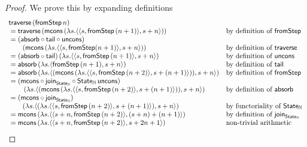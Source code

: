 \documentclass{article}
\begin{document}
\begin{proof}
We prove this by expanding definitions
$$
\begin{array}{ll}
\mathsf{traverse}\, (\mathsf{fromStep}\, n) \\
{}= \mathsf{traverse}\, (\mathsf{mcons}\, (\lambda s. \langle \langle s, \mathsf{fromStep}\, (n + 1) \rangle, s + n \rangle))
	& \mbox{by definition of }\mathsf{fromStep} \\
{}= (\mathsf{absorb} \circ \mathsf{tail} \circ \mathsf{uncons})\, \\\qquad (\mathsf{mcons}\, (\lambda s. \langle \langle s, \mathsf{fromStep} (n + 1) \rangle, s + n \rangle))
	& \mbox{by definition of }\mathsf{traverse} \\
{}= (\mathsf{absorb} \circ \mathsf{tail})\, (\lambda s. \langle \langle s, \mathsf{fromStep}\, (n + 1) \rangle, s + n \rangle)
	& \mbox{by definition of }\mathsf{uncons} \\
{}= \mathsf{absorb}\, (\lambda s. \langle \mathsf{fromStep}\, (n + 1), s + n \rangle)
	& \mbox{by definition of }\mathsf{tail} \\
{}= \mathsf{absorb}\, (\lambda s. \langle (\mathsf{mcons}\, (\lambda s. \langle \langle s, \mathsf{fromStep}\, (n + 2) \rangle, s + (n + 1) \rangle)), s + n \rangle)
	& \mbox{by definition of }\mathsf{fromStep} \\
{}= (\mathsf{mcons} \circ \mathsf{join}_{\mathsf{State}_{\mathbb{N}}} \circ \mathsf{State}_{\mathbb{N}}\,\mathsf{uncons}) \\\qquad \, (\lambda s. \langle (\mathsf{mcons}\, (\lambda s. \langle \langle s, \mathsf{fromStep}\, (n + 2) \rangle, s + (n + 1) \rangle)), s + n \rangle)
	& \mbox{by definition of }\mathsf{absorb} \\
{}= (\mathsf{mcons} \circ \mathsf{join}_{\mathsf{State}_{\mathbb{N}}})\, \\\qquad (\lambda s. \langle (\lambda s. \langle \langle s, \mathsf{fromStep}\, (n + 2) \rangle, s + (n + 1) \rangle), s + n \rangle)
	& \mbox{by functoriality of }\mathsf{State}_{\mathbb{N}} \\
{}= \mathsf{mcons}\, (\lambda s. \langle \langle s + n, \mathsf{fromStep}\,(n + 2) \rangle, (s + n) + (n + 1) \rangle)
	& \mbox{by definition of } \mathsf{join}_{\mathsf{State}_{\mathbb{N}}} \\
{}= \mathsf{mcons}\, (\lambda s. \langle \langle s + n, \mathsf{fromStep}\,(n + 2) \rangle, s + 2n + 1 \rangle)
	& \mbox{non-trivial arithmetic} \\
\end{array}
$$
\end{proof}



\end{document}

